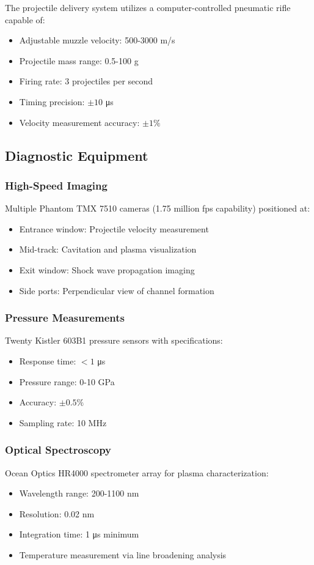 \documentclass[12pt,a4paper]{article}
\begin{document}
The projectile delivery system utilizes a computer-controlled pneumatic rifle capable of:
\begin{itemize}
\item Adjustable muzzle velocity: 500-3000 m/s
\item Projectile mass range: 0.5-100 g
\item Firing rate: 3 projectiles per second
\item Timing precision: $\pm 10$ μs
\item Velocity measurement accuracy: $\pm 1\%$
\end{itemize}

\subsection{Diagnostic Equipment}

\subsubsection{High-Speed Imaging}
Multiple Phantom TMX 7510 cameras (1.75 million fps capability) positioned at:
\begin{itemize}
\item Entrance window: Projectile velocity measurement
\item Mid-track: Cavitation and plasma visualization
\item Exit window: Shock wave propagation imaging
\item Side ports: Perpendicular view of channel formation
\end{itemize}

\subsubsection{Pressure Measurements}
Twenty Kistler 603B1 pressure sensors with specifications:
\begin{itemize}
\item Response time: $< 1$ μs
\item Pressure range: 0-10 GPa
\item Accuracy: $\pm 0.5\%$
\item Sampling rate: 10 MHz
\end{itemize}

\subsubsection{Optical Spectroscopy}
Ocean Optics HR4000 spectrometer array for plasma characterization:
\begin{itemize}
\item Wavelength range: 200-1100 nm
\item Resolution: 0.02 nm
\item Integration time: 1 μs minimum
\item Temperature measurement via line broadening analysis
\end{itemize}
\end{document}

